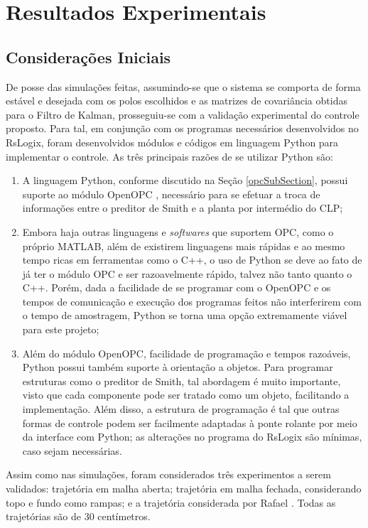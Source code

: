 \section{Resultados Experimentais}
\subsection{Considerações Iniciais}
De posse das simulações feitas, assumindo-se que o sistema se comporta de forma estável e desejada com os polos escolhidos e as matrizes de covariância obtidas para o Filtro de Kalman, prosseguiu-se com a validação experimental do controle proposto. Para tal, em conjunção com os programas necessários desenvolvidos no RsLogix, foram desenvolvidos módulos e códigos em linguagem Python para implementar o controle. As três principais razões de se utilizar Python são:
\begin{enumerate}
\item A linguagem Python, conforme discutido na Seção \ref{opcSubSection}, possui suporte ao módulo OpenOPC \cite{OpenOPC}, necessário para se efetuar a troca de informações entre o preditor de Smith e a planta por intermédio do CLP;
\item Embora haja outras linguagens e \textit{softwares} que suportem OPC, como o próprio MATLAB, além de existirem linguagens mais rápidas e ao mesmo tempo ricas em ferramentas como o C++, o uso de Python se deve ao fato de já ter o módulo OPC e ser razoavelmente rápido, talvez não tanto quanto o C++. Porém, dada a facilidade de se programar com o OpenOPC e os tempos de comunicação e execução dos programas feitos não interferirem com o tempo de amostragem, Python se torna uma opção extremamente viável para este projeto;
\item Além do módulo OpenOPC, facilidade de programação e tempos razoáveis, Python possui também suporte à orientação a objetos. Para programar estruturas como o preditor de Smith, tal abordagem é muito importante, visto que cada componente pode ser tratado como um objeto, facilitando a implementação. Além disso, a estrutura de programação é tal que outras formas de controle podem ser facilmente adaptadas à ponte rolante por meio da interface com Python; as alterações no programa do RsLogix são mínimas, caso sejam necessárias.
\end{enumerate}

Assim como nas simulações, foram considerados três experimentos a serem validados: trajetória em malha aberta; trajetória em malha fechada, considerando topo e fundo como rampas; e a trajetória considerada por Rafael \cite{rafaelMestrado}. Todas as trajetórias são de 30 centímetros.

